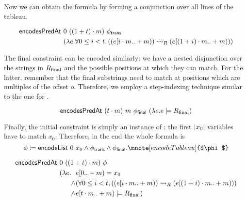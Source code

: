 Now we can obtain the formula  by forming a conjunction over all lines of the tableau.
\begin{lemma}
  \begin{align*}
    \textsf{encodesPredAt}~&0~((1 +{t}) \cdot m)~\phi_{\textsf{trans}} \\
                                                   &(\lambda e. \forall 0 \le i < t, ((e[i \cdot m..+m)) \rightsquigarrow_{R} (e[(1 +{i}) \cdot m ..+m)))
  \end{align*}
\end{lemma}

The final constraint can be encoded similarly: we have a nested disjunction over the strings in $R_{\text{final}}$ and the possible positions at which they can match. For the latter, remember that the final substrings need to match at positions which are multiples of the offset $o$. Therefore, we employ a step-indexing technique similar to the one for \encodeWindowsLine. 

\begin{lemma}
  \[\textsf{encodesPredAt}~(t \cdot m)~m~\phi_{\textsf{final}}~(\lambda e. e \models R_{\text{final}}) \]
\end{lemma}

Finally, the initial constraint is simply an instance of \encodeList: the first $|x_0|$ variables have to match $x_0$. 
Therefore, in the end the whole formula is
\[ \phi \defeq \encodeList~0~x_0 \land \phi_{\textsf{trans}} \land \phi_{\textsf{final}}.\mnote[encodeTableau]{$\phi$} \]

\begin{lemma}\label{lem:phi_correct}
  \begin{align*}
    \textsf{encodesPredAt}~&0~((1 +{t}) \cdot m)~\phi \\
                 &(\lambda e. \begin{aligned}[t]
                  &e[0.. + m) = x_0 \\
                   \land &  (\forall 0 \le i < t, ((e[i \cdot m..+m)) \rightsquigarrow_{R} (e[(1 +{i}) \cdot m..+m))) \\
                   \land & e[t \cdot m .. + m) \models R_{\text{final}})
                \end{aligned}
  \end{align*}
\end{lemma}

